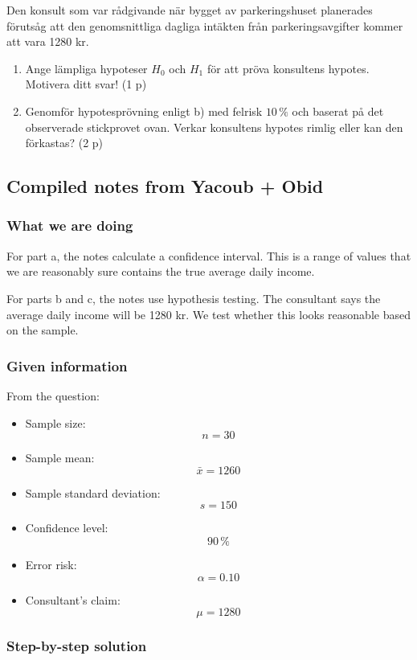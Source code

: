 \documentclass[10pt]{article}
\begin{document}
Den konsult som var rådgivande när bygget av parkeringshuset
planerades förutsåg att den genomsnittliga dagliga intäkten från
parkeringsavgifter kommer att vara 1280 kr.

\begin{enumerate}[label=\alph*),resume]
\item
Ange lämpliga hypoteser $H_0$ och $H_1$ för att pröva konsultens
hypotes. Motivera ditt svar!
\hfill (1 p)

\item
Genomför hypotesprövning enligt b) med felrisk $10\,\%$ och baserat
på det observerade stickprovet ovan. Verkar konsultens hypotes rimlig
eller kan den förkastas?
\hfill (2 p)
\end{enumerate}

\subsection*{Compiled notes from Yacoub + Obid}

\subsubsection*{What we are doing}
For part a, the notes calculate a confidence interval.
This is a range of values that we are reasonably sure contains
the true average daily income.

For parts b and c, the notes use hypothesis testing.
The consultant says the average daily income will be 1280 kr.
We test whether this looks reasonable based on the sample.

\subsubsection*{Given information}
From the question:

\begin{itemize}
\item Sample size:
\[
n=30
\]
\item Sample mean:
\[
\bar{x}=1260
\]
\item Sample standard deviation:
\[
s=150
\]
\item Confidence level:
\[
90\,\%
\]
\item Error risk:
\[
\alpha=0.10
\]
\item Consultant's claim:
\[
\mu=1280
\]
\end{itemize}

\subsubsection*{Step-by-step solution}
\end{document}

